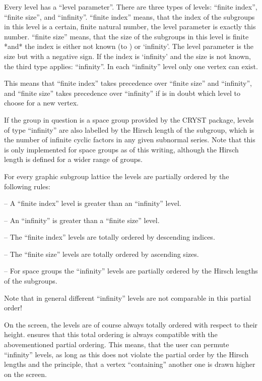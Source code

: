 Every level has a ``level parameter''.
There are three types of levels: ``finite index'', ``finite size'', and 
``infinity''. ``finite index'' means, that the index of the subgroups
in this level is a certain, finite natural number, the level parameter 
is exactly this number. ``finite size'' means, that the size of the
subgroups in this level is finite *and* the index is either not known
(to {\GAP}) or `infinity'. The level parameter is the size but with a
negative sign. If the index is `infinity' and the size is
not known, the third type applies: ``infinity''. In each ``infinity''
level only one vertex can exist.

This means that ``finite index'' takes precedence over ``finite size'' 
and ``infinity'', and ``finite size'' takes precedence over
``infinity'' if {\XGAP} is in doubt which level to choose for a new
vertex. 

If the group in question is a space group provided by the CRYST 
package, levels of type ``infinity'' are also labelled by the Hirsch 
length of the subgroup, which is the number of infinite cyclic factors
in any given subnormal series. Note that this is only implemented for 
space groups as of this writing, although the Hirsch length is defined for
a wider range of groups.

For every graphic subgroup lattice the levels are partially ordered by
the following rules:

\beginlist%
\item{--} A ``finite index'' level is greater than an ``infinity'' level.

\item{--} An ``infinity'' is greater than a ``finite size'' level.

\item{--} The ``finite index'' levels are totally ordered by descending indices.

\item{--} The ``finite size'' levels are totally ordered by ascending sizes. 

\item{--} For space groups the ``infinity'' levels are partially ordered by
     the Hirsch lengths of the subgroups.
\endlist

Note that in general different ``infinity'' levels are not comparable in this
partial order!

On the screen, the levels are of course always totally ordered with respect
to their height. {\XGAP} ensures that this total ordering is always
compatible with the abovementioned partial ordering. This means, that the
user can permute ``infinity'' levels, as long as this does not violate the
partial order by the Hirsch lengths and the
principle, that a vertex ``containing'' another one is drawn higher on
the screen.

